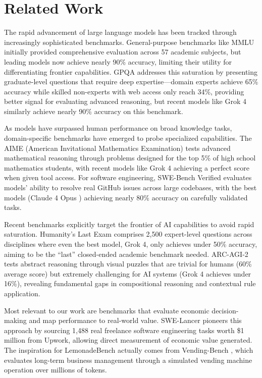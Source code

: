 \documentclass[11pt]{article}
\begin{document}
\section{Related Work}
\label{sec:related}

The rapid advancement of large language models has been tracked through increasingly sophisticated benchmarks.
General-purpose benchmarks like MMLU \cite{hendrycks2021measuringmassivemultitasklanguage} initially provided comprehensive evaluation across 57 academic subjects, but leading models now achieve nearly 90\% accuracy, limiting their utility for differentiating frontier capabilities.
GPQA \cite{rein2023gpqagraduatelevelgoogleproofqa} addresses this saturation by presenting graduate-level questions that require deep expertise—domain experts achieve 65\% accuracy while skilled non-experts with web access only reach 34\%, providing better signal for evaluating advanced reasoning, but recent models like Grok 4 \cite{grok4_xai_2025} similarly achieve nearly 90\% accuracy on this benchmark.

As models have surpassed human performance on broad knowledge tasks, domain-specific benchmarks have emerged to probe specialized capabilities.
The AIME (American Invitational Mathematics Examination) tests advanced mathematical reasoning through problems designed for the top 5\% of high school mathematics students, with recent models like Grok 4 \cite{grok4_xai_2025} achieving a perfect score when given tool access.
For software engineering, SWE-Bench Verified \cite{chowdhury2024swebenchverified} evaluates models' ability to resolve real GitHub issues across large codebases, with the best models (Claude 4 Opus \cite{anthropic2025claude4}) achieving nearly 80\% accuracy on carefully validated tasks.

Recent benchmarks explicitly target the frontier of AI capabilities to avoid rapid saturation.
Humanity's Last Exam \cite{phan2025humanitysexam} comprises 2,500 expert-level questions across disciplines where even the best model, Grok 4, only achieves under 50\% accuracy, aiming to be the ``last'' closed-ended academic benchmark needed.
ARC-AGI-2 \cite{chollet2025arcagi2newchallengefrontier} tests abstract reasoning through visual puzzles that are trivial for humans (60\% average score) but extremely challenging for AI systems (Grok 4 achieves under 16\%), revealing fundamental gaps in compositional reasoning and contextual rule application.

Most relevant to our work are benchmarks that evaluate economic decision-making and map performance to real-world value.
SWE-Lancer \cite{miserendino2025swelancer} pioneers this approach by sourcing 1,488 real freelance software engineering tasks worth \$1 million from Upwork, allowing direct measurement of economic value generated.
The inspiration for LemonadeBench actually comes from Vending-Bench \cite{andonlabs2025vendingbench}, which evaluates long-term business management through a simulated vending machine operation over millions of tokens.
\end{document}
